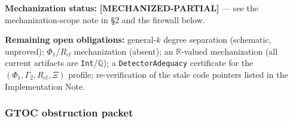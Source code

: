 \documentclass[
]{article}
\begin{document}
\textbf{Mechanization status:} \textbf{{[}MECHANIZED-PARTIAL{]}} --- see the mechanization-scope note in §2 and the firewall below.

\textbf{Remaining open obligations:} general-\(k\) degree separation (schematic, unproved); \(\Phi_1\)/\(R_{cl}\) mechanization (absent); an \(\mathbb{R}\)-valued mechanization (all current artifacts are \texttt{Int}/\(\mathbb{Q}\)); a \texttt{DetectorAdequacy} certificate for the \((\Phi_1,\Gamma_2,R_{cl},\Xi)\) profile; re-verification of the stale code pointers listed in the Implementation Note.

\subsubsection{GTOC obstruction packet}\label{gtoc-obstruction-packet}
\end{document}

